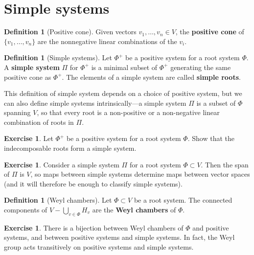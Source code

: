 \documentclass[12pt]{article}
\theoremstyle{remark}
\theoremstyle{definition}
\newtheorem{defn}[thm]{Definition}
\newtheorem{exercise}[thm]{Exercise}
\newcommand{\defnword}[1]{\textbf{#1}}
\begin{document}
\section{Simple systems}

\begin{defn}[Positive cone]
Given vectors $v_1, \ldots, v_n \in V$, the \defnword{positive cone}
of $\{ v_1, \ldots, v_n \}$ are the nonnegative linear combinations of the $v_i$.
\end{defn}

\begin{defn}[Simple systems]
Let $\Phi^{+}$ be a positive system for a root system $\Phi$.  A
\defnword{simple system} $\Pi$ for $\Phi^{+}$ is a minimal subset of
$\Phi^{+}$ generating the same positive cone as $\Phi^{+}$.  The
elements of a simple system are called \defnword{simple roots}.
\end{defn}
This definition of simple system depends on a choice of positive
system, but we can also define simple systems intrinsically---a simple
system $\Pi$ is a subset of $\Phi$ spanning $V$, so that every root is
a non-positive or a non-negative linear combination of roots in $\Pi$.

\begin{exercise}
Let $\Phi^{+}$ be a positive system for a root system $\Phi$.  Show
that the indecomposable roots form a simple system.
\end{exercise}

\begin{exercise}
Consider a simple system $\Pi$ for a root system $\Phi \subset V$.
Then the span of $\Pi$ is $V$, so maps between simple systems
determine maps between vector spaces (and it will therefore be enough
to classify simple systems).
\end{exercise}

\begin{defn}[Weyl chambers]
Let $\Phi \subset V$ be a root system.  The connected components of $V
- \bigcup_{v \in \Phi} H_v$ are the \defnword{Weyl chambers} of
$\Phi$.
\end{defn}

\begin{exercise}
There is a bijection between Weyl chambers of $\Phi$ and positive
systems, and between positive systems and simple systems.  In fact,
the Weyl group acts transitively on positive systems and simple
systems.
\end{exercise}
\end{document}
